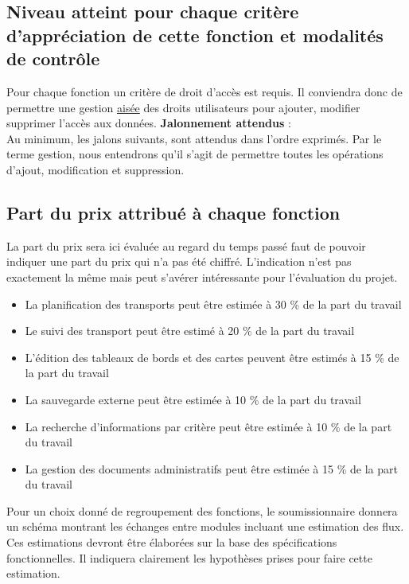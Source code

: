 \subsection{Niveau atteint pour chaque critère d'appréciation de cette fonction et modalités de contrôle}
Pour chaque fonction un critère de droit d'accès est requis. Il conviendra donc de permettre une gestion \underline{aisée} des droits utilisateurs pour ajouter, modifier supprimer l'accès aux données.
\textbf{Jalonnement attendus} :
\\
Au minimum, les jalons suivants, sont attendus dans l'ordre exprimés. Par le terme \og{}gestion\fg{}, nous entendrons qu'il s'agit de permettre toutes les opérations d'ajout, modification et suppression.

\subsection{Part du prix attribué à chaque fonction}
La part du prix sera ici évaluée au regard du temps passé faut de pouvoir indiquer une part du prix qui n'a pas été chiffré. L'indication n'est pas exactement la même mais peut s'avérer intéressante pour l'évaluation du projet. 
\begin{itemize}[label=\textbullet]
 \item La planification des transports peut être estimée à 30 \% de la part du travail
 \item Le suivi des transport peut être estimé à 20 \% de la part du travail
 \item L'édition des tableaux de bords et des cartes peuvent être estimés à 15 \% de la part du travail
 \item La sauvegarde externe peut être estimée à 10 \% de la part du travail
 \item La recherche d'informations par critère peut être estimée à 10 \% de la part du travail
 \item La gestion des documents administratifs peut être estimée à 15 \% de la part du travail
\end{itemize}
Pour un choix donné de regroupement des fonctions, le soumissionnaire donnera un schéma montrant les échanges entre modules incluant une estimation des flux. 
\\
Ces estimations devront être élaborées sur la base des spécifications fonctionnelles. Il indiquera clairement les hypothèses prises pour faire cette estimation. 


